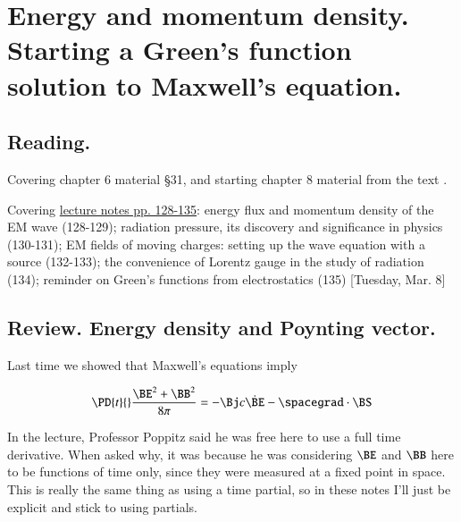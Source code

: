 %
%

\chapter{Energy and momentum density.  Starting a Green's function solution to Maxwell's equation.}
\label{chap:relativisticElectrodynamicsL17}
{}
\date{Mar 8, 2011}

\beginArtNoToc

\section{Reading.}

Covering chapter 6 material \S 31, and starting chapter 8 material from the text \cite{landau1980classical}.

Covering \href{http://www.physics.utoronto.ca/~poppitz/epoppitz/PHY450_files/RelEMpp128-135.pdf}{lecture notes pp. 128-135}: energy flux and momentum density of the EM wave (128-129); radiation pressure, its discovery and significance in physics (130-131); EM fields of moving charges: setting up the wave equation with a source (132-133); the convenience of Lorentz gauge in the study of radiation (134); reminder on Green's functions from electrostatics (135) [Tuesday, Mar. 8] 

\section{Review.  Energy density and Poynting vector.}

Last time we showed that Maxwell's equations imply

\begin{equation}\label{eqn:relativisticElectrodynamicsL17:10}
\PD{t}{} \frac{\BE^2 + \BB^2 }{8 \pi} = -\Bj c\dot \BE - \spacegrad \cdot \BS
\end{equation}

In the lecture, Professor Poppitz said he was free here to use a full time derivative.  When asked why, it was because he was considering $\BE$ and $\BB$ here to be functions of time only, since they were measured at a fixed point in space.  This is really the same thing as using a time partial, so in these notes I'll just be explicit and stick to using partials.

